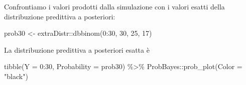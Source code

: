\documentclass[
  11pt,
]{krantz}
\makeatletter
\newenvironment{Shaded}{\begin{snugshade}}{\end{snugshade}}
\newcommand{\AttributeTok}[1]{\textcolor[rgb]{0.61,0.61,0.61}{#1}}
\newcommand{\CommentTok}[1]{\textcolor[rgb]{0.37,0.37,0.37}{\textit{#1}}}
\newcommand{\DecValTok}[1]{\textcolor[rgb]{0.06,0.06,0.06}{#1}}
\newcommand{\FloatTok}[1]{\textcolor[rgb]{0.06,0.06,0.06}{#1}}
\newcommand{\FunctionTok}[1]{\textcolor[rgb]{0,0,0}{#1}}
\newcommand{\NormalTok}[1]{#1}
\newcommand{\OtherTok}[1]{\textcolor[rgb]{0.37,0.37,0.37}{#1}}
\newcommand{\SpecialCharTok}[1]{\textcolor[rgb]{0,0,0}{#1}}
\newcommand{\StringTok}[1]{\textcolor[rgb]{0.5,0.5,0.5}{#1}}
\newenvironment{kframe}{%
\medskip{}
\setlength{\fboxsep}{.8em}
 \def\at@end@of@kframe{}%
 \ifinner\ifhmode%
  \def\at@end@of@kframe{\end{minipage}}%
  \begin{minipage}{\columnwidth}%
 \fi\fi%
 \def\FrameCommand##1{\hskip\@totalleftmargin \hskip-\fboxsep
 \colorbox{shadecolor}{##1}\hskip-\fboxsep
     \hskip-\linewidth \hskip-\@totalleftmargin \hskip\columnwidth}%
 \MakeFramed {\advance\hsize-\width
   \@totalleftmargin\z@ \linewidth\hsize
   \@setminipage}}%
 {\par\unskip\endMakeFramed%
 \at@end@of@kframe}
\renewenvironment{Shaded}{\begin{kframe}}{\end{kframe}}
\theoremstyle{definition}
\theoremstyle{definition}
\theoremstyle{definition}
\theoremstyle{definition}
\theoremstyle{remark}
\makeatother
\begin{document}
\begin{Shaded}
\end{Shaded}

Confrontiamo i valori prodotti dalla simulazione con i valori esatti della distribuzione predittiva a posteriori:

\begin{Shaded}
\begin{Highlighting}[]
\NormalTok{prob30 }\OtherTok{\textless{}{-}}\NormalTok{ extraDistr}\SpecialCharTok{::}\FunctionTok{dbbinom}\NormalTok{(}\DecValTok{0}\SpecialCharTok{:}\DecValTok{30}\NormalTok{, }\DecValTok{30}\NormalTok{, }\DecValTok{25}\NormalTok{, }\DecValTok{17}\NormalTok{)}
\end{Highlighting}
\end{Shaded}

\begin{Shaded}
\end{Shaded}

La distribuzione predittiva a posteriori esatta è

\begin{Shaded}
\begin{Highlighting}[]
\FunctionTok{tibble}\NormalTok{(}\AttributeTok{Y =} \DecValTok{0}\SpecialCharTok{:}\DecValTok{30}\NormalTok{, }\AttributeTok{Probability =}\NormalTok{ prob30) }\SpecialCharTok{\%\textgreater{}\%}
\NormalTok{  ProbBayes}\SpecialCharTok{::}\FunctionTok{prob\_plot}\NormalTok{(}\AttributeTok{Color =} \StringTok{"black"}\NormalTok{)}
\end{Highlighting}
\end{Shaded}
\end{document}
